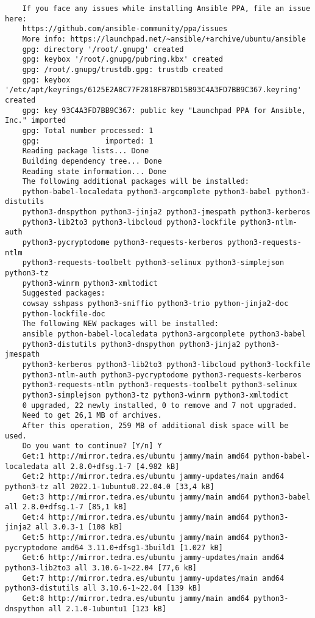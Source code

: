 \documentclass[../main.tex]{subfiles}
\begin{document}
\begin{lstlisting}
	If you face any issues while installing Ansible PPA, file an issue here:
	https://github.com/ansible-community/ppa/issues
	More info: https://launchpad.net/~ansible/+archive/ubuntu/ansible
	gpg: directory '/root/.gnupg' created
	gpg: keybox '/root/.gnupg/pubring.kbx' created
	gpg: /root/.gnupg/trustdb.gpg: trustdb created
	gpg: keybox '/etc/apt/keyrings/6125E2A8C77F2818FB7BD15B93C4A3FD7BB9C367.keyring' created
	gpg: key 93C4A3FD7BB9C367: public key "Launchpad PPA for Ansible, Inc." imported
	gpg: Total number processed: 1
	gpg:               imported: 1
	Reading package lists... Done
	Building dependency tree... Done
	Reading state information... Done
	The following additional packages will be installed:
	python-babel-localedata python3-argcomplete python3-babel python3-distutils
	python3-dnspython python3-jinja2 python3-jmespath python3-kerberos
	python3-lib2to3 python3-libcloud python3-lockfile python3-ntlm-auth
	python3-pycryptodome python3-requests-kerberos python3-requests-ntlm
	python3-requests-toolbelt python3-selinux python3-simplejson python3-tz
	python3-winrm python3-xmltodict
	Suggested packages:
	cowsay sshpass python3-sniffio python3-trio python-jinja2-doc
	python-lockfile-doc
	The following NEW packages will be installed:
	ansible python-babel-localedata python3-argcomplete python3-babel
	python3-distutils python3-dnspython python3-jinja2 python3-jmespath
	python3-kerberos python3-lib2to3 python3-libcloud python3-lockfile
	python3-ntlm-auth python3-pycryptodome python3-requests-kerberos
	python3-requests-ntlm python3-requests-toolbelt python3-selinux
	python3-simplejson python3-tz python3-winrm python3-xmltodict
	0 upgraded, 22 newly installed, 0 to remove and 7 not upgraded.
	Need to get 26,1 MB of archives.
	After this operation, 259 MB of additional disk space will be used.
	Do you want to continue? [Y/n] Y
	Get:1 http://mirror.tedra.es/ubuntu jammy/main amd64 python-babel-localedata all 2.8.0+dfsg.1-7 [4.982 kB]
	Get:2 http://mirror.tedra.es/ubuntu jammy-updates/main amd64 python3-tz all 2022.1-1ubuntu0.22.04.0 [33,4 kB]
	Get:3 http://mirror.tedra.es/ubuntu jammy/main amd64 python3-babel all 2.8.0+dfsg.1-7 [85,1 kB]
	Get:4 http://mirror.tedra.es/ubuntu jammy/main amd64 python3-jinja2 all 3.0.3-1 [108 kB]
	Get:5 http://mirror.tedra.es/ubuntu jammy/main amd64 python3-pycryptodome amd64 3.11.0+dfsg1-3build1 [1.027 kB]
	Get:6 http://mirror.tedra.es/ubuntu jammy-updates/main amd64 python3-lib2to3 all 3.10.6-1~22.04 [77,6 kB]
	Get:7 http://mirror.tedra.es/ubuntu jammy-updates/main amd64 python3-distutils all 3.10.6-1~22.04 [139 kB]
	Get:8 http://mirror.tedra.es/ubuntu jammy/main amd64 python3-dnspython all 2.1.0-1ubuntu1 [123 kB]

\end{lstlisting}
\end{document}
